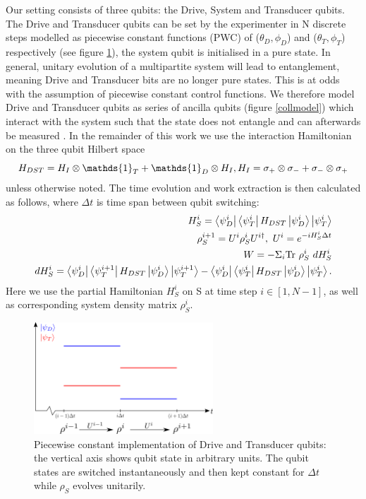 Our setting consists of three qubits: the Drive, System and Transducer qubits. The Drive and Transducer qubits can be set by the experimenter in N discrete steps modelled as piecewise constant functions (PWC) of ($\theta_D, \phi_D$) and ($\theta_T, \phi_T$) respectively (see figure \ref{pwc}), the system qubit is initialised in a pure state.
In general, unitary evolution of a multipartite system will lead to entanglement, meaning Drive and Transducer bits are no longer pure states. This is at odds with the assumption of piecewise constant control functions. We therefore model Drive and Transducer qubits as series of ancilla qubits (figure \ref{collmodel}) which interact with the system such that the state does not entangle and can afterwards be measured \cite{beyer2020}.
In the remainder of this work we use the interaction Hamiltonian on the three qubit Hilbert space
\begin{equation*}
	H_{DST} = H_{I} \otimes \mathds{1}_T + \mathds{1}_D \otimes H_{I}, \\
	H_{I} = \sigma_{+} \otimes \sigma_{-} + \sigma_{-} \otimes \sigma_{+}
\end{equation*}
unless otherwise noted.
The time evolution and work extraction is then calculated as follows, where $\Delta t$ is time span between qubit switching:
\begin{align}
	H_S^i = \bra{\psi_D^i}\bra{\psi_T^i} H_{DST} \ket{\psi_D^i} \ket{\psi_T^i} \\
	\rho_S^{i+1} = U^i \rho_S^i U^{i\dagger}, \ U^i = e^{-iH_S^i \Delta t} \\
	W = - \Sigma_i \mathrm{Tr} \ \rho_S^i \ dH_S^i \\
	dH_S^i = \bra{\psi_D^i}\bra{\psi_T^{i+1}} H_{DST} \ket{\psi_D^i} \ket{\psi_T^{i+1}} - \bra{\psi_D^i}\bra{\psi_T^i} H_{DST} \ket{\psi_D^i} \ket{\psi_T^i}.	
\end{align}
Here we use the partial Hamiltonian $H_S^i$ on S at time step $i \in [1, N - 1]$, as well as corresponding system density matrix $\rho_S^i$.


\begin{figure}
	\centering
	\includegraphics[width=0.6\textwidth]{img/pwc}
	\caption{Piecewise constant implementation of Drive and Transducer qubits: the vertical axis shows qubit state in arbitrary units. The qubit states are switched instantaneously and then kept constant for $\Delta t$ while $\rho_S$ evolves unitarily.}
	\label{pwc}
\end{figure}

